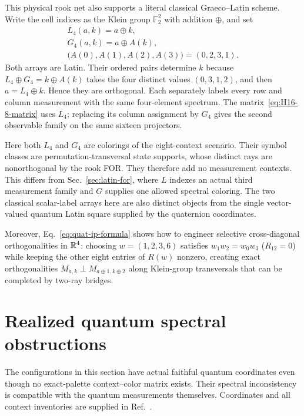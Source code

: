 \documentclass[aps,pra,reprint,superscriptaddress,longbibliography,nofootinbib,floatfix,10pt]{revtex4-2}
\theoremstyle{definition}\newtheorem{definition}[theorem]{Definition}
\theoremstyle{remark}\newtheorem{remark}[theorem]{Remark}
\begin{document}
\begin{itemize}
This physical rook net also supports a literal classical Graeco--Latin scheme. Write the cell indices as the Klein group $\mathbb F_2^2$ with addition $\oplus$, and set
\begin{equation}\label{eq:graeco4-pair}
\begin{gathered}
L_4(a,k)=a\oplus k,\\
G_4(a,k)=a\oplus A(k),\\
\bigl(A(0),A(1),A(2),A(3)\bigr)=(0,2,3,1).
\end{gathered}
\end{equation}
Both arrays are Latin. Their ordered pairs determine $k$ because
$L_4\oplus G_4=k\oplus A(k)$ takes the four distinct values $(0,3,1,2)$, and then $a=L_4\oplus k$. Hence they are orthogonal. Each separately labels every row and column measurement with the same four-element spectrum. The matrix~\eqref{eq:H16-8-matrix} uses $L_4$; replacing its column assignment by $G_4$ gives the second observable family on the same sixteen projectors.

Here both $L_4$ and $G_4$ are colorings of the eight-context scenario. Their symbol classes are permutation-transversal state supports, whose distinct rays are nonorthogonal by the rook FOR. They therefore add no measurement contexts. This differs from Sec.~\ref{sec:latin-for}, where $L$ indexes an actual third measurement family and $G$ supplies one allowed spectral coloring. The two classical scalar-label arrays here are also distinct objects from the single vector-valued quantum Latin square supplied by the quaternion coordinates.

Moreover, Eq.~\eqref{eq:quat-ip-formula} shows how to engineer selective cross-diagonal orthogonalities in $\mathbb R^4$: choosing $w=(1,2,3,6)$ satisfies $w_1w_2=w_0w_3$ ($R_{12}=0$) while keeping the other eight entries of $R(w)$ nonzero, creating exact orthogonalities $M_{a,k}\perp M_{a\oplus 1,k\oplus 2}$ along Klein-group transversals that can be completed by two-ray bridges.
\end{itemize}



\section{Realized quantum spectral obstructions}\label{sec:obstructions}

The configurations in this section have actual faithful quantum coordinates even though no exact-palette context--color matrix exists. Their spectral inconsistency is compatible with the quantum measurements themselves. Coordinates and all context inventories are supplied in Ref.~\cite{svozil2026contexts,supplement}.
\end{document}
